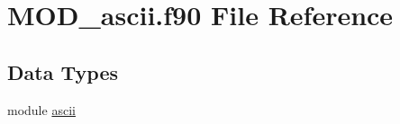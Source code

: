 \hypertarget{MOD__ascii_8f90}{\section{M\-O\-D\-\_\-ascii.\-f90 File Reference}
\label{MOD__ascii_8f90}
}
\subsection*{Data Types}
\begin{DoxyCompactItemize}
\item 
module \hyperlink{classascii}{ascii}
\end{DoxyCompactItemize}
